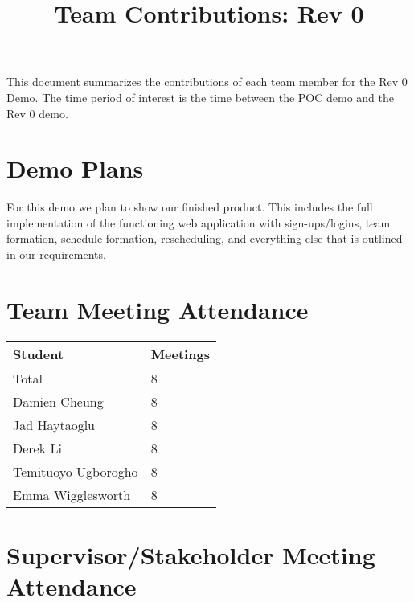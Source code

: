 \documentclass{article}
\title{Team Contributions: Rev 0\\\progname}
\author{\authname}
\date{}
\begin{document}
\maketitle

This document summarizes the contributions of each team member for the Rev 0
Demo.  The time period of interest is the time between the POC demo and the Rev
0 demo.

\section{Demo Plans}

For this demo we plan to show our finished product. This includes the full
implementation of the functioning web application with sign-ups/logins, team
formation, schedule formation, rescheduling, and everything else that
is outlined in our requirements.

\section{Team Meeting Attendance}


\begin{table}[H]
    \centering
    \begin{tabular}{ll}
        \toprule
        \textbf{Student}    & \textbf{Meetings} \\
        \midrule
        Total               & 8                 \\
        Damien Cheung       & 8                 \\
        Jad Haytaoglu       & 8                 \\
        Derek Li            & 8                 \\
        Temituoyo Ugborogho & 8                 \\
        Emma Wigglesworth   & 8                 \\
        \bottomrule
    \end{tabular}
\end{table}

\section{Supervisor/Stakeholder Meeting Attendance}
\end{document}
